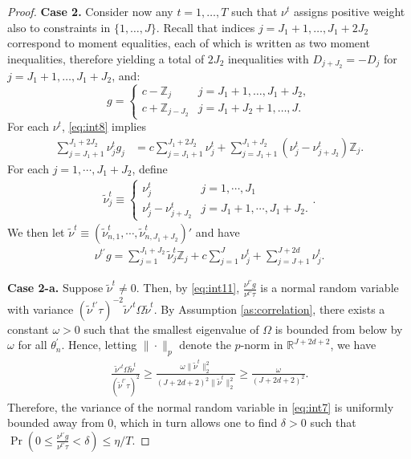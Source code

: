 \documentclass[letterpaper,11pt]{article}
\theoremstyle{myplain}
\theoremstyle{mydefinition}
\theoremstyle{myremark}
\newcommand{\HH}{\mathbb{Z}}
\numberwithin{equation}{section}
\numberwithin{figure}{section}
\begin{document}
\begin{appendices}
\begin{proof}
\noindent \textbf{Case 2.} Consider now any $t = 1,\dots,T$ such that $\nu^t$ assigns positive weight also to constraints in $\{1,\dots,J\}$. 
Recall that indices $j=J_1+1,\dots,J_1+2J_2$ correspond to moment equalities, each of which is written as two moment inequalities, therefore yielding a total of $2J_2$ inequalities with $D_{j+J_2} = - D_{j}$ for $j =J_1+1,\dots,J_1+J_2$, and:
\begin{equation}
g = \left\{\begin{array}{ll}
 c - \HH_j & j =J_1+1,\dots,J_1+J_2, \\
 c + \HH_{j-J_2} & j =J_1+J_2+1,\dots,J.
\end{array} \label{eq:int8}
\right.
\end{equation}
For each $\nu^t$, \eqref{eq:int8} implies
\begin{align}
\sum_{j=J_1+1}^{J_1+2J_2} \nu^t_j g_j &=c\sum_{j=J_1+1}^{J_1+2J_2} \nu^t_j + \sum_{j=J_1+1}^{J_1+J_2} (\nu^t_j-\nu^t_{j+J_2})\HH_j.\label{eq:int9}
\end{align}
For each $j=1,\cdots,J_1+J_2$, define
\begin{align}
	\tilde\nu^t_j\equiv\begin{cases}
	\nu^t_j&j=1,\cdots, J_1\\
	\nu^t_j-\nu^t_{j+J_2}&j=J_1+1,\cdots,J_1+J_2.
	\end{cases}.\label{eq:int10}
\end{align}
We then let $\tilde\nu^t\equiv(\tilde\nu^t_{n,1},\cdots,\tilde \nu^t_{n,J_1+J_2})'$ and have
\begin{align}
\nu^{t \prime}g=\sum_{j=1}^{J_1+J_2}\tilde\nu^t_j\HH_j+c\sum_{j=1}^J\nu^t_j+\sum_{j=J+1}^{J+2d}\nu^t_j.\label{eq:int11}
\end{align}

\noindent \textbf{Case 2-a.} Suppose  $\tilde\nu^t\ne 0$. Then, by \eqref{eq:int11}, $\frac{\nu^{t \prime}g}{\nu^{t \prime}\tau}$ is a normal random variable  with variance $(\tilde\nu^{t \prime}\tau)^{-2}\tilde\nu'^t\Omega\tilde\nu^t$.   By Assumption \ref{as:correlation}, there exists a constant $\omega>0$ such that the smallest eigenvalue of $\Omega$ is bounded from below by $\omega$ for all $\theta_n^\prime$.
Hence, letting $\|\cdot\|_p$ denote the $p$-norm in $\mathbb R^{J+2d+2}$, we have
\begin{align}
	\frac{\tilde\nu'^t\Omega\tilde\nu^t}{(\tilde\nu^{t \prime}\tau)^2}\ge
	 \frac{\omega\|\tilde\nu^t\|_2^2}{(J+2d+2)^2\|\tilde\nu^t\|_2^2}\ge  \frac{\omega}{(J+2d+2)^2}.
\end{align}
Therefore, the variance of the normal random variable in \eqref{eq:int7} is uniformly bounded away from 0, which in turn allows one to find $\delta>0$ such that
${\Pr}(0\le\frac{\nu^{t \prime}g}{\nu^{t \prime}\tau} < \delta)\le \eta/T$.


\end{proof}
\end{appendices}
\end{document}
